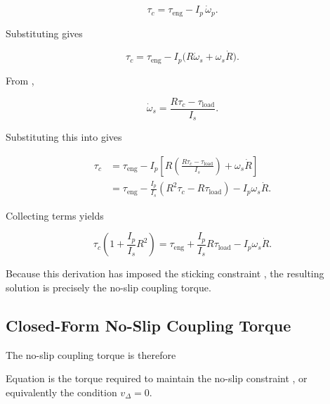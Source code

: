 \documentclass[11pt]{article}
\numberwithin{equation}{section}
\begin{document}
\[
\tau_c
=
\tau_{\text{eng}}
-
I_p\,\dot{\omega}_p.
\]

Substituting  gives

\begin{equation}
\tau_c
=
\tau_{\text{eng}}
-
I_p\bigl(R\dot{\omega}_s+\omega_s\dot R\bigr).
\label{eq:tau_c_intermediate}
\end{equation}

From ,

\[
\dot{\omega}_s
=
\frac{R\tau_c-\tau_{\text{load}}}{I_s}.
\]

Substituting this into  gives

\begin{align}
\tau_c
&=
\tau_{\text{eng}}
-
I_p
\left[
R\left(
\frac{R\tau_c-\tau_{\text{load}}}{I_s}
\right)
+
\omega_s\dot R
\right]
\nonumber\\[6pt]
&=
\tau_{\text{eng}}
-
\frac{I_p}{I_s}
\left(
R^2\tau_c-R\tau_{\text{load}}
\right)
-
I_p\omega_s\dot R.
\end{align}

Collecting terms yields

\begin{equation}
\tau_c
\left(
1+\frac{I_p}{I_s}R^2
\right)
=
\tau_{\text{eng}}
+
\frac{I_p}{I_s}R\tau_{\text{load}}
-
I_p\omega_s\dot R.
\label{eq:tau_c_rearranged}
\end{equation}

Because this derivation has imposed the sticking constraint
, the resulting solution is precisely the no-slip
coupling torque.

\subsection{Closed-Form No-Slip Coupling Torque}

The no-slip coupling torque is therefore


Equation  is the torque required to maintain the no-slip
constraint
,
or equivalently the condition
\(
v_{\Delta}=0.
\)

\end{document}
